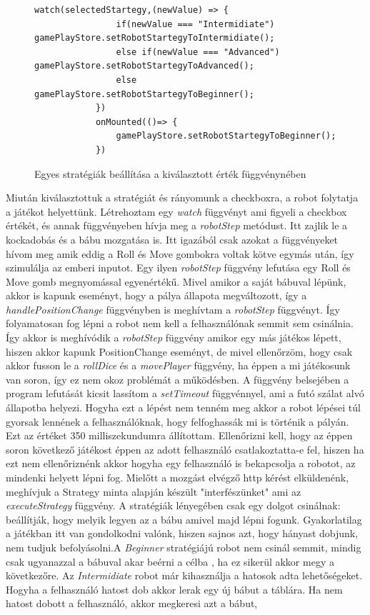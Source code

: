 \documentclass[a4paper,twoside]{article}
\begin{document}
\begin{figure}
	\caption{Egyes stratégiák beállítása a kiválasztott érték függvénynében}
	\begin{minipage}{\textwidth}
		\begin{lstlisting}[style=javascriptStyle]
			watch(selectedStartegy,(newValue) => {
				if(newValue === "Intermidiate") gamePlayStore.setRobotStartegyToIntermidiate();
				else if(newValue === "Advanced") gamePlayStore.setRobotStartegyToAdvanced();
				else gamePlayStore.setRobotStartegyToBeginner();
			})
			onMounted(()=> {
				gamePlayStore.setRobotStartegyToBeginner();
			})
		\end{lstlisting}
	\end{minipage}
	
	\label{setStrat}
\end{figure}
\FloatBarrier
Miután kiválasztottuk a stratégiát és rányomunk a checkboxra, a robot folytatja a játékot helyettünk. Létrehoztam egy \textit{watch} függvényt ami figyeli a checkbox értékét, és annak függvényeben hívja meg a \textit{robotStep} metódust. Itt zajlik le a kockadobás és a bábu mozgatása is. Itt igazából csak azokat a függvényeket hívom meg amik eddig a Roll és Move gombokra voltak kötve egymás után, így szimulálja az emberi inputot. Egy ilyen \textit{robotStep} függvény lefutása egy Roll és Move gomb megnyomással egyenértékű. Mivel amikor a saját bábuval lépünk, akkor is kapunk eseményt, hogy a pálya állapota megváltozott, így a \textit{handlePositionChange} függvényben is meghívtam a \textit{robotStep} függvényt. Így folyamatosan fog lépni a robot nem kell a felhasználónak semmit sem csinálnia. Így akkor is meghívódik a \textit{robotStep} függvény amikor egy más játékos lépett, hiszen akkor kapunk PositionChange eseményt, de mivel ellenőrzöm, hogy csak akkor fusson le a \textit{rollDice} és a \textit{movePlayer} függvény, ha éppen a mi játékosunk van soron, így ez nem okoz problémát a működésben. A függvény belsejében a program lefutását kicsit lassítom a \textit{setTimeout} függvénnyel, ami a futó szálat alvó állapotba helyezi. Hogyha ezt a lépést nem tenném meg akkor a robot lépései túl gyorsak lennének a felhasználóknak, hogy felfoghassák mi is történik a pályán. Ezt az értéket 350  milliszekundumra állítottam. Ellenőrizni kell, hogy az éppen soron következő játékost éppen az adott felhasználó csatlakoztatta-e fel, hiszen ha ezt nem ellenőriznénk akkor hogyha egy felhasználó is bekapcsolja a robotot, az mindenki helyett lépni fog. Mielőtt a mozgást elvégző http kérést elküldenénk, meghívjuk a Strategy minta alapján készült "interfészünket" ami az \textit{executeStrategy} függvény. A stratégiák lényegében csak egy dolgot csinálnak: beállítják, hogy melyik legyen az a bábu amivel majd lépni fogunk. Gyakorlatilag a játékban itt van gondolkodni valónk, hiszen sajnos azt, hogy hányast dobjunk, nem tudjuk befolyásolni.A \textit{Beginner} stratégiájú robot nem csinál semmit, mindig csak ugyanazzal a bábuval akar beérni a célba , ha ez sikerül akkor megy a következőre. Az \textit{Intermidiate} robot már kihasználja a hatosok adta lehetőségeket. Hogyha a felhasználó hatost dob akkor lerak egy új bábut a táblára. Ha nem hatost dobott a felhasználó, akkor megkeresi azt a bábut, 
\end{document}
